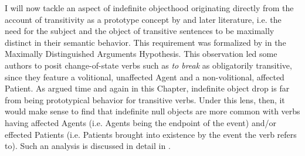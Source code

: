 I will now tackle an aspect of indefinite objecthood originating directly from the account of transitivity as a prototype concept by \textcite{HopperThompson1980} and later literature, i.e. the need for the subject and the object of transitive sentences to be maximally distinct in their semantic behavior. This requirement was formalized by \textcite[30]{Naess2007} in the Maximally Distinguished Arguments Hypothesis. This observation led some authors to posit change-of-state verbs such as \textit{to break} as obligatorily transitive, since they feature a volitional, unaffected Agent and a non-volitional, affected Patient. As argued time and again in this Chapter, indefinite object drop is far from being prototypical behavior for transitive verbs. Under this lens, then, it would make sense to find that indefinite null objects are more common with verbs having affected Agents (i.e. Agents being the endpoint of the event) and/or effected Patients (i.e. Patients brought into existence by the event the verb refers to). Such an analysis is discussed in detail in \textcite{Naess2007}.\\
